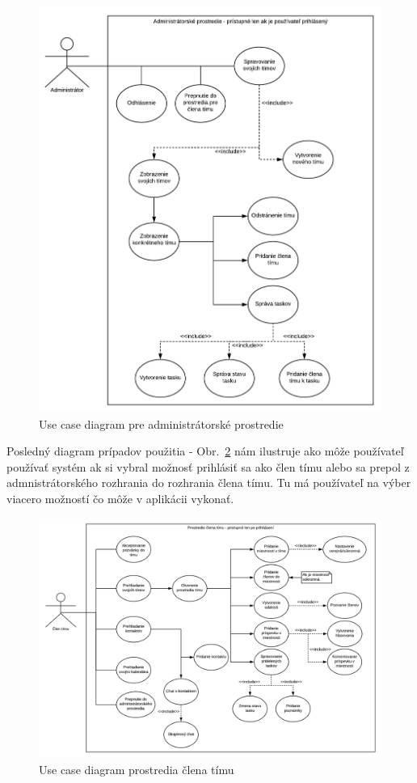 \begin{figure}[H]
    \centering
    \includegraphics[scale=0.50]{img/DP_use_case_administrator.png}
    \caption{Use case diagram pre administrátorské prostredie}
    \label{fig:use_case_administrator}
\end{figure}

\indent Posledný diagram prípadov použitia - Obr.~\ref{fig:use_case_clen_timu} nám ilustruje ako môže používateľ používať systém ak si vybral možnosť prihlásiť sa ako člen tímu alebo sa prepol z admnistrátorského rozhrania do rozhrania člena tímu. Tu má používateľ na výber viacero možností čo môže v aplikácii vykonať.

\begin{figure}[H]
    \centering
    \includegraphics[scale=0.50]{img/DP_use_case_clen_timu.png}
    \caption{Use case diagram prostredia člena tímu}
    \label{fig:use_case_clen_timu}
\end{figure}

